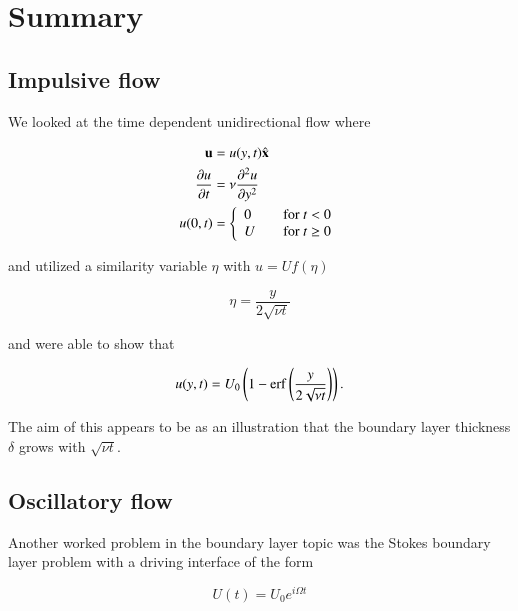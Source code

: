 \section{Summary}
\subsection{Impulsive flow}

We looked at the time dependent unidirectional flow where

\begin{align}\label{eqn:continuumFluidsReview:2230}
\Bu &= u(y, t) \xcap \\
\PD{t}{u} &= \nu \PDSq{y}{u} \\
u(0, t) &=
\left\{
\begin{array}{l l}
0 & \quad \mbox{for $t < 0$} \\
U & \quad \mbox{for $t \ge 0$}
\end{array}
\right.
\end{align}

and utilized a similarity variable $\eta$ with $u = U f(\eta)$

\begin{equation}\label{eqn:continuumFluidsReview:2250}
\eta = \frac{y}{2 \sqrt{\nu t}}
\end{equation}

and were able to show that

\begin{equation}\label{eqn:continuumFluidsReview:2270}
u(y, t) = U_0 \left(1 - \erf\left(\frac{y}{2 \sqrt{\nu t}}\right) \right).
\end{equation}

The aim of this appears to be as an illustration that the boundary layer thickness $\delta$ grows with $\sqrt{\nu t}$.


\subsection{Oscillatory flow}

Another worked problem in the boundary layer topic was the Stokes boundary layer problem with a driving interface of the form

\begin{equation}\label{eqn:continuumFluidsReview:2370}
U(t) = U_0 e^{i \Omega t}
\end{equation}

